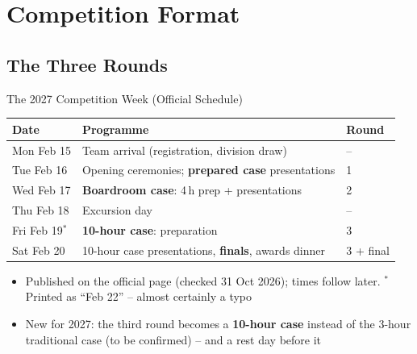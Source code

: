 \documentclass[aspectratio=169,11pt]{beamer}
\begin{document}
\section{Competition Format}

\subsection{The Three Rounds}

\begin{frame}{The 2027 Competition Week (Official Schedule)}
  \begin{center}
    \small
    \begin{tabular}{lll}
      \toprule
      \textbf{Date} & \textbf{Programme} & \textbf{Round} \\
      \midrule
      Mon Feb 15 & Team arrival (registration, division draw) & -- \\
      Tue Feb 16 & Opening ceremonies; \textbf{prepared case} presentations & 1 \\
      Wed Feb 17 & \textbf{Boardroom case}: 4\,h prep + presentations & 2 \\
      Thu Feb 18 & Excursion day & -- \\
      Fri Feb 19$^{*}$ & \textbf{10-hour case}: preparation & 3 \\
      Sat Feb 20 & 10-hour case presentations, \textbf{finals}, awards dinner & 3 + final \\
      \bottomrule
    \end{tabular}
  \end{center}
  \begin{itemize}
    \item Published on the official page (checked 31 Oct 2026); times follow later. $^{*}$Printed as ``Feb 22'' -- almost certainly a typo
    \item New for 2027: the third round becomes a \textbf{10-hour case} instead of the 3-hour traditional case (to be confirmed) -- and a rest day before it
  \end{itemize}
\end{frame}
\end{document}

